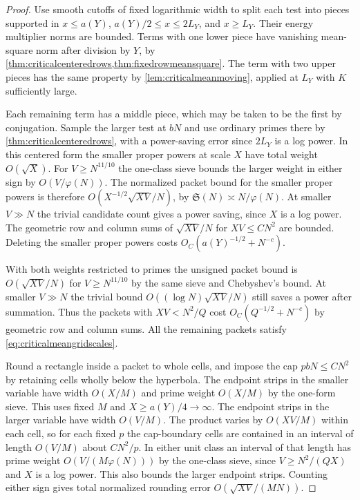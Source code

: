 \documentclass[11pt,a4paper]{article}
\numberwithin{equation}{section}
\newcommand{\SSS}{\mathfrak S}
\begin{document}
\begin{proof}
Use smooth cutoffs of fixed logarithmic width to split
each test into pieces supported in $x\le a(Y)$,
$a(Y)/2\le x\le2L_Y$, and $x\ge L_Y$. Their energy
multiplier norms are bounded. Terms with one lower
piece have vanishing mean-square norm after division
by $Y$, by \cref{thm:criticalcenteredrows,thm:fixedrowmeansquare}.
The term with two upper pieces has the same property
by \cref{lem:criticalmeanmoving}, applied at $L_Y$ with
$K$ sufficiently large.

Each remaining term has a middle piece, which may be
taken to be the first by conjugation. Sample the larger
test at $bN$ and use ordinary primes there by
\cref{thm:criticalcenteredrows}, with a power-saving
error since $2L_Y$ is a log power. In this centered
form the smaller proper powers at scale $X$ have total
weight $O(\sqrt X)$. For $V\ge N^{11/10}$ the one-class
sieve bounds the larger weight in either sign by
$O(V/\varphi(N))$. The normalized packet bound for
the smaller proper powers is therefore
$O(X^{-1/2}\sqrt{XV}/N)$, by $\SSS(N)\asymp N/\varphi(N)$.
At smaller $V\gg N$ the trivial candidate count gives
a power saving, since $X$ is a log power. The geometric
row and column sums of $\sqrt{XV}/N$ for $XV\le CN^2$
are bounded. Deleting the smaller proper powers costs
$O_C(a(Y)^{-1/2}+N^{-c})$.

With both weights restricted to primes the unsigned
packet bound is $O(\sqrt{XV}/N)$ for $V\ge N^{11/10}$
by the same sieve and Chebyshev's bound. At smaller
$V\gg N$ the trivial bound $O((\log N)\sqrt{XV}/N)$
still saves a power after summation. Thus the packets
with $XV<N^2/Q$ cost $O_C(Q^{-1/2}+N^{-c})$ by
geometric row and column sums. All the remaining
packets satisfy \cref{eq:criticalmeangridscales}.

Round a rectangle inside a packet to whole cells, and
impose the cap $pbN\le CN^2$ by retaining cells wholly
below the hyperbola. The endpoint strips in the smaller
variable have width $O(X/M)$ and prime weight $O(X/M)$
by the one-form sieve. This uses fixed $M$ and
$X\ge a(Y)/4\to\infty$. The endpoint strips in the
larger variable have width $O(V/M)$. The product
varies by $O(XV/M)$ within each cell, so for each
fixed $p$ the cap-boundary cells are contained in an
interval of length $O(V/M)$ about $CN^2/p$.
In either unit class an interval of that length has
prime weight $O(V/(M\varphi(N)))$ by the one-class
sieve, since $V\ge N^2/(QX)$ and $X$ is a log power.
This also bounds the larger endpoint strips. Counting
either sign gives total normalized rounding error
$O(\sqrt{XV}/(MN))$.


\end{proof}
\end{document}
